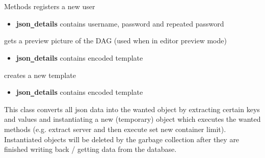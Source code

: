 \begin{methodenv}{Methods}
registers a new user
\begin{itemize}
        \item \textbf{json\texttt{\_}details}
        contains username, password and repeated password
\end{itemize}

gets a preview picture of the DAG (used when in editor preview mode)
\begin{itemize}
        \item \textbf{json\texttt{\_}details}
        contains encoded template
\end{itemize}

creates a new template
\begin{itemize}
        \item \textbf{json\texttt{\_}details}
        contains encoded template
\end{itemize}

\end{methodenv}

This class converts all json data into the wanted object by extracting certain keys and values and instantiating
a new (temporary) object which executes the wanted methods (e.g. extract server and then execute set new container limit).
Instantiated objects will be deleted by the garbage collection after they are finished writing back / getting data
from the database.

